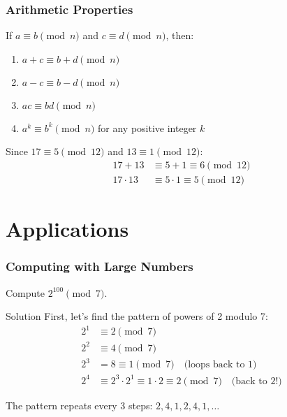 \documentclass[10pt]{beamer}
\begin{document}
\begin{frame}
    \frametitle{Arithmetic Properties}
    \begin{theorem}
        If $a \equiv b \pmod{n}$ and $c \equiv d \pmod{n}$, then:
        \begin{enumerate}
            \item $a + c \equiv b + d \pmod{n}$
            \item $a - c \equiv b - d \pmod{n}$
            \item $ac \equiv bd \pmod{n}$
            \item $a^k \equiv b^k \pmod{n}$ for any positive integer $k$
        \end{enumerate}
    \end{theorem}

    \begin{example}
        Since $17 \equiv 5 \pmod{12}$ and $13 \equiv 1 \pmod{12}$:
        \begin{align}
            17 + 13     & \equiv 5 + 1 \equiv 6 \pmod{12}     \\
            17 \cdot 13 & \equiv 5 \cdot 1 \equiv 5 \pmod{12}
        \end{align}
    \end{example}
\end{frame}



\section{Applications}

\begin{frame}
    \frametitle{Computing with Large Numbers}
    \begin{example}
        Compute $2^{100} \pmod{7}$.
    \end{example}

    \begin{block}{Solution}
        First, let's find the pattern of powers of 2 modulo 7:
        \begin{align}
            2^1 & \equiv 2 \pmod{7}                                                                 \\
            2^2 & \equiv 4 \pmod{7}                                                                 \\
            2^3 & = 8 \equiv 1 \pmod{7} \quad \text{(loops back to 1)}                              \\
            2^4 & \equiv 2^3 \cdot 2^1 \equiv 1 \cdot 2 \equiv 2 \pmod{7} \quad \text{(back to 2!)}
        \end{align}

        The pattern repeats every 3 steps: $2, 4, 1, 2, 4, 1, \ldots$
    \end{block}
\end{frame}
\end{document}
